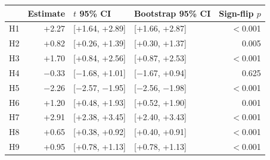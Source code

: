 \begin{tabular}{@{}lrllr@{}}\toprule
 & Estimate & $t$ 95\% CI & Bootstrap 95\% CI & Sign-flip $p$\\\midrule
H1 & +2.27 & [+1.64, +2.89] & [+1.66, +2.87] & \ensuremath{<}0.001\\
H2 & +0.82 & [+0.26, +1.39] & [+0.30, +1.37] & 0.005\\
H3 & +1.70 & [+0.84, +2.56] & [+0.87, +2.53] & \ensuremath{<}0.001\\
H4 & \ensuremath{-}0.33 & [\ensuremath{-}1.68, +1.01] & [\ensuremath{-}1.67, +0.94] & 0.625\\
H5 & \ensuremath{-}2.26 & [\ensuremath{-}2.57, \ensuremath{-}1.95] & [\ensuremath{-}2.56, \ensuremath{-}1.98] & \ensuremath{<}0.001\\
H6 & +1.20 & [+0.48, +1.93] & [+0.52, +1.90] & 0.001\\
H7 & +2.91 & [+2.38, +3.45] & [+2.40, +3.43] & \ensuremath{<}0.001\\
H8 & +0.65 & [+0.38, +0.92] & [+0.40, +0.91] & \ensuremath{<}0.001\\
H9 & +0.95 & [+0.78, +1.13] & [+0.78, +1.13] & \ensuremath{<}0.001\\
\bottomrule\end{tabular}

